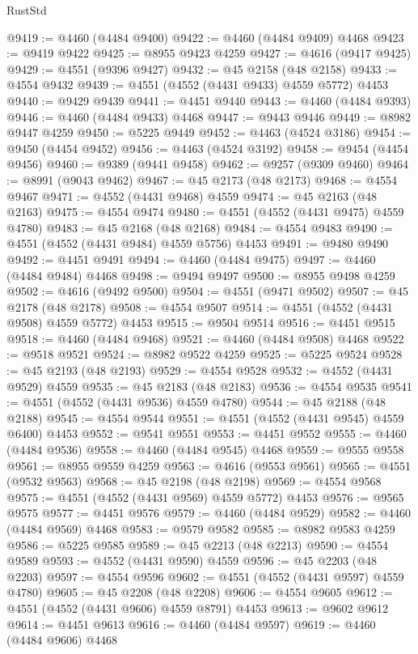 \begin{lexlean}{RustStd}
\begin{coremodule}
@9419 := @4460 (@4484 @9400)
@9422 := @4460 (@4484 @9409) @4468
@9423 := @9419 @9422
@9425 := @8955 @9423 @4259
@9427 := @4616 (@9417 @9425)
@9429 := @4551 (@9396 @9427)
@9432 := @45 @2158 (@48 @2158)
@9433 := @4554 @9432
@9439 := @4551 (@4552 (@4431 @9433) @4559 @5772) @4453
@9440 := @9429 @9439
@9441 := @4451 @9440
@9443 := @4460 (@4484 @9393)
@9446 := @4460 (@4484 @9433) @4468
@9447 := @9443 @9446
@9449 := @8982 @9447 @4259
@9450 := @5225 @9449
@9452 := @4463 (@4524 @3186)
@9454 := @9450 (@4454 @9452)
@9456 := @4463 (@4524 @3192)
@9458 := @9454 (@4454 @9456)
@9460 := @9389 (@9441 @9458)
@9462 := @9257 (@9309 @9460)
@9464 := @8991 (@9043 @9462)
@9467 := @45 @2173 (@48 @2173)
@9468 := @4554 @9467
@9471 := @4552 (@4431 @9468) @4559
@9474 := @45 @2163 (@48 @2163)
@9475 := @4554 @9474
@9480 := @4551 (@4552 (@4431 @9475) @4559 @4780)
@9483 := @45 @2168 (@48 @2168)
@9484 := @4554 @9483
@9490 := @4551 (@4552 (@4431 @9484) @4559 @5756) @4453
@9491 := @9480 @9490
@9492 := @4451 @9491
@9494 := @4460 (@4484 @9475)
@9497 := @4460 (@4484 @9484) @4468
@9498 := @9494 @9497
@9500 := @8955 @9498 @4259
@9502 := @4616 (@9492 @9500)
@9504 := @4551 (@9471 @9502)
@9507 := @45 @2178 (@48 @2178)
@9508 := @4554 @9507
@9514 := @4551 (@4552 (@4431 @9508) @4559 @5772) @4453
@9515 := @9504 @9514
@9516 := @4451 @9515
@9518 := @4460 (@4484 @9468)
@9521 := @4460 (@4484 @9508) @4468
@9522 := @9518 @9521
@9524 := @8982 @9522 @4259
@9525 := @5225 @9524
@9528 := @45 @2193 (@48 @2193)
@9529 := @4554 @9528
@9532 := @4552 (@4431 @9529) @4559
@9535 := @45 @2183 (@48 @2183)
@9536 := @4554 @9535
@9541 := @4551 (@4552 (@4431 @9536) @4559 @4780)
@9544 := @45 @2188 (@48 @2188)
@9545 := @4554 @9544
@9551 := @4551 (@4552 (@4431 @9545) @4559 @6400) @4453
@9552 := @9541 @9551
@9553 := @4451 @9552
@9555 := @4460 (@4484 @9536)
@9558 := @4460 (@4484 @9545) @4468
@9559 := @9555 @9558
@9561 := @8955 @9559 @4259
@9563 := @4616 (@9553 @9561)
@9565 := @4551 (@9532 @9563)
@9568 := @45 @2198 (@48 @2198)
@9569 := @4554 @9568
@9575 := @4551 (@4552 (@4431 @9569) @4559 @5772) @4453
@9576 := @9565 @9575
@9577 := @4451 @9576
@9579 := @4460 (@4484 @9529)
@9582 := @4460 (@4484 @9569) @4468
@9583 := @9579 @9582
@9585 := @8982 @9583 @4259
@9586 := @5225 @9585
@9589 := @45 @2213 (@48 @2213)
@9590 := @4554 @9589
@9593 := @4552 (@4431 @9590) @4559
@9596 := @45 @2203 (@48 @2203)
@9597 := @4554 @9596
@9602 := @4551 (@4552 (@4431 @9597) @4559 @4780)
@9605 := @45 @2208 (@48 @2208)
@9606 := @4554 @9605
@9612 := @4551 (@4552 (@4431 @9606) @4559 @8791) @4453
@9613 := @9602 @9612
@9614 := @4451 @9613
@9616 := @4460 (@4484 @9597)
@9619 := @4460 (@4484 @9606) @4468

\end{coremodule}
\end{lexlean}
